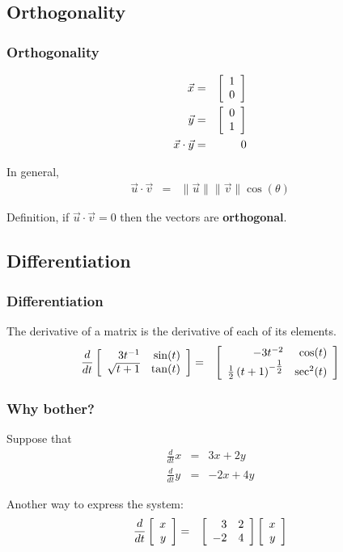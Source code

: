 \subsection{Orthogonality}

\begin{frame}
  \frametitle{Orthogonality}

  \begin{eqnarray*}
    \vec{x} & = & \left[ \begin{array}{r} 1 \\ 0 \end{array} \right] \\
    \vec{y} & = & \left[ \begin{array}{r} 0 \\ 1 \end{array} \right] \\
    \vec{x}\cdot\vec{y} & = & 0
  \end{eqnarray*}

  In general,
  \begin{eqnarray*}
    \vec{u}\cdot\vec{v} & = & \| \vec{u} \| \| \vec{v} \| \cos(\theta)
  \end{eqnarray*}

  Definition, if $\vec{u}\cdot\vec{v}=0$ then the vectors are \textbf{orthogonal}.
  
\end{frame}

\subsection{Differentiation}

\begin{frame}
  \frametitle{Differentiation}

  The derivative of a matrix is the derivative of each of its elements.
  \begin{eqnarray*}
    \frac{d}{dt} \left[ \begin{array}{rr} 3t^{-1} & \sin(t) \\ \sqrt{t+1} & \tan(t) \end{array} \right] & = & 
    \left[ \begin{array}{rr} -3t^{-2} & \cos(t) \\ \mbox{$\frac{1}{2}$}\left( t+1\right)^{-\mbox{$\frac{1}{2}$}} & \sec^2(t) \end{array} \right]
  \end{eqnarray*}

\end{frame}

\begin{frame}
  \frametitle{Why bother?}

  Suppose that
  \begin{eqnarray*}
    \frac{d}{dt} x & = & 3x + 2y \\
    \frac{d}{dt} y & = & -2 x + 4 y
  \end{eqnarray*}

  Another way to express the system:
  \begin{eqnarray*}
    \frac{d}{dt} \left[ \begin{array}{r} x \\ y \end{array} \right] & = & \left[ \begin{array}{rr} 3 & 2 \\ -2 & 4 \end{array} \right] \left[ \begin{array}{r} x \\ y \end{array} \right]
  \end{eqnarray*}

\end{frame}


